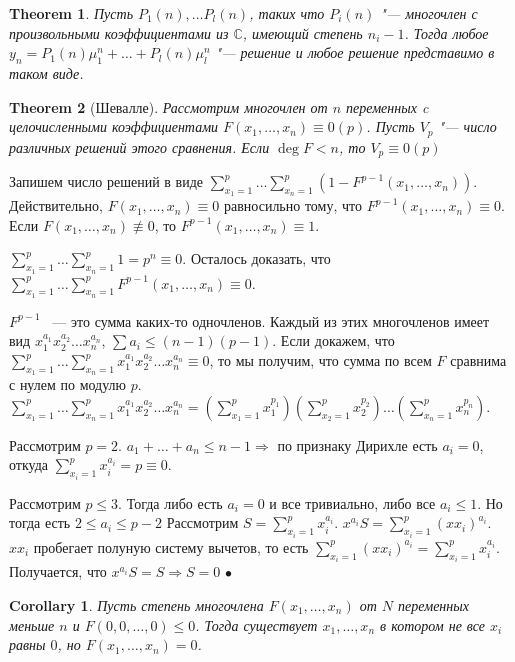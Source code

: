 \documentclass[a4paper]{article}
\theoremstyle{plain}
\newtheorem{theorem}{Theorem}
\newtheorem{corollary}{Corollary}
\theoremstyle{remark}
\theoremstyle{definition}
\renewenvironment{proof}{{\bfseries Proof}}{$\bullet$}
\newcommand{\myC}{\mathbb{C}}
\newcommand{\mysum}{\sum\limits}
\begin{document}
\begin{theorem}
	Пусть $P_1(n), \ldots P_l(n)$, таких что $P_i(n)$ "--- многочлен с произвольными коэффициентами из $\myC$, имеющий степень $n_i - 1$. Тогда любое $y_n = P_1(n) \mu_1^n + \ldots + P_l(n)\mu_l^n$ "--- решение и любое решение представимо в таком виде.
\end{theorem}
\begin{theorem}[Шевалле]
	Рассмотрим многочлен от $n$ переменных c целочисленными коэффициентами $F(x_1, \ldots, x_n) \equiv 0(p)$. Пусть $V_p$ "--- число различных решений этого сравнения. Если $\deg F < n$, то $V_p \equiv 0(p)$
\end{theorem}


\begin{proof}
	Запишем число решений в виде $\mysum_{x_1 = 1}^p \ldots \mysum_{x_n = 1}^p (1 - F^{p-1}(x_1, \ldots, x_n))$. Действительно, $F(x_1, \ldots, x_n) \equiv 0$ равносильно тому, что $F^{p-1}(x_1, \ldots, x_n) \equiv 0$. Если $F(x_1, \ldots, x_n) \not\equiv 0$, то $F^{p-1}(x_1, \ldots, x_n) \equiv 1$.  

	$\mysum_{x_1 = 1}^p \ldots \mysum_{x_n = 1}^p 1 = p^n \equiv 0$. Осталось доказать, что $\mysum_{x_1 = 1}^p \ldots \mysum_{x_n = 1}^p F^{p-1}(x_1, \ldots, x_n) \equiv 0$.
	
	$F^{p-1}$ ~--- это сумма каких-то одночленов. Каждый из этих многочленов имеет вид $x_1^{a_1}x_2^{a_2}\ldots x_n^{a_n}$, $\mysum a_i \leq (n-1)(p-1)$. 
	Если докажем, что $\mysum_{x_1 = 1}^p \ldots \mysum_{x_n = 1}^p x_1^{a_1}x_2^{a_2}\ldots x_n^{a_n} \equiv 0$, то мы получим, что сумма по всем $F$ сравнима с нулем по модулю $p$. 
	$\mysum_{x_1 = 1}^p \ldots \mysum_{x_n = 1}^p x_1^{a_1}x_2^{a_2}\ldots x_n^{a_n} = (\mysum_{x_1 = 1}^p x_1^{p_1}) (\mysum_{x_2 = 1}^p x_2^{p_2}) \ldots (\mysum_{x_n = 1}^p x_n^{p_n})$.

	Рассмотрим $p = 2$. $a_1 + \ldots + a_n \leq n - 1 \Rightarrow$ по признаку Дирихле есть $a_i = 0$, откуда $\mysum_{x_i = 1}^p x_i^{a_i} = p \equiv 0$.
	
	Рассмотрим $p \leq 3$. Тогда либо есть $a_i = 0$ и все тривиально, либо все $a_i \leq 1$. Но тогда есть $2 \leq a_i \leq p-2$
	Рассмотрим $S = \mysum_{x_i = 1}^p x_i^{a_i}$. $x^{a_i}S = \mysum_{x_i = 1}^p (xx_i)^{a_i}$. $xx_i$ пробегает полуную систему вычетов, то есть $\mysum_{x_i = 1}^p (xx_i)^{a_i} = \mysum_{x_i = 1}^p x_i^{a_i}$. Получается, что $x^{a_i}S = S \Rightarrow S = 0$
\end{proof}

\begin{corollary}
	Пусть степень многочлена $F(x_1, \ldots, x_n)$ от $N$ переменных меньше $n$ и $F(0,0,\ldots, 0) \leq 0$. Тогда существует $x_1, \ldots, x_n$ в котором не все $x_i$ равны $0$, но $F(x_1, \ldots, x_n) = 0$.
\end{corollary}
\end{document}
